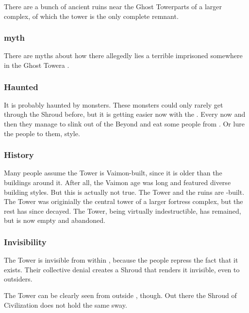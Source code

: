 There are a bunch of ancient ruins near the Ghost Tower\dash parts of a larger complex, of which the tower is the only complete remnant. 






\subsubsection{\Haskelek{} myth}
There are myths about how there allegedly lies a terrible \daemon{} imprisoned somewhere in the Ghost Tower\dash a . 





\subsubsection{Haunted}
\index{\succubus}%
It is probably haunted by monsters. 
These monsters could only rarely get through the Shroud before, but it is getting easier now with the . 
Every now and then they manage to slink out of the Beyond and eat some people from \Forclin. 
Or lure the people to them,  style. 





\subsubsection{History}
Many people assume the Tower is Vaimon-built, since it is older than the \Ortaican{} buildings around it. 
After all, the Vaimon age was long and featured diverse building styles. 
But this is actually not true. 
The Tower and the ruins are \resphan-built.
The Tower was originially the central tower of a larger fortress complex, but the rest has since decayed. 
The Tower, being virtually indestructible, has remained, but is now empty and abandoned. 





\subsubsection{Invisibility}
The Tower is invisible from within \Forclin, because the people repress the fact that it exists. 
Their collective denial creates a Shroud that renders it invisible, even to outsiders. 

The Tower can be clearly seen from outside \Forclin, though. 
Out there the Shroud of Civilization does not hold the same sway. 

